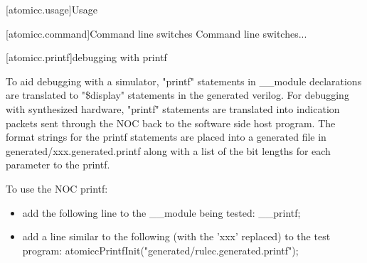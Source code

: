 [atomicc.usage]{Usage}

[atomicc.command]{Command line switches}
Command line switches...

[atomicc.printf]{debugging with printf}

To aid debugging with a simulator, "printf" statements in __module declarations are
translated to "\$display" statements in the generated verilog.
For debugging with synthesized hardware, "printf" statements are translated into
indication packets sent through the NOC back to the software side host program.
The format strings for the printf statements are placed into a generated file
in generated/xxx.generated.printf along with a list of the bit lengths for each
parameter to the printf.

To use the NOC printf:
\begin{itemize}
\item add the following line to the __module being tested: __printf;
\item add a line similar to the following (with the 'xxx' replaced) to the test program:
           atomiccPrintfInit("generated/rulec.generated.printf");
\end{itemize}
